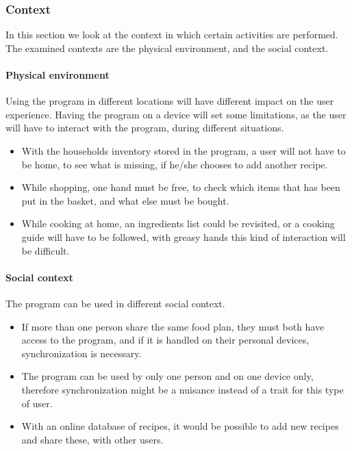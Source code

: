 \subsubsection{Context}
In this section we look at the context in which certain activities are performed. The examined contexts are the physical environment, and the social context.

\paragraph{Physical environment}
Using the program in different locations will have different impact on the user experience. Having the program on a device will set some limitations, as the user will have to interact with the program, during different situations.
\begin{itemize}
\item With the households inventory stored in the program, a user will not have to be home, to see what is missing, if he/she chooses to add another recipe.
\item While shopping, one hand must be free, to check which items that has been put in the basket, and what else must be bought.
\item While cooking at home, an ingredients list could be revisited, or a cooking guide will have to be followed, with greasy hands this kind of interaction will be difficult.
\end{itemize}

\paragraph{Social context}
The program can be used in different social context.
\begin{itemize}
\item If more than one person share the same food plan, they must both have access to the program, and if it is handled on their personal devices, synchronization is necessary.
\item The program can be used by only one person and on one device only, therefore synchronization might be a nuisance instead of a trait for this type of user.
\item With an online database of recipes, it would be possible to add new recipes and share these, with other users.
\end{itemize}